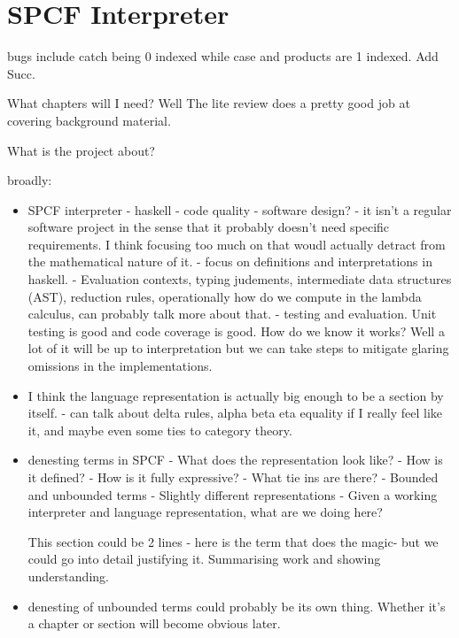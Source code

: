 \documentclass[12pt,a4paper]{report}
\theoremstyle{definition}
\theoremstyle{remark}
\begin{document}
\chapter{SPCF Interpreter}

bugs include catch being 0 indexed while case and products are 1 indexed. Add Succ.

What chapters will I need?
Well The lite review does a pretty good job at covering background material.

What is the project about?

broadly:
\begin{itemize}
    \item SPCF interpreter
        - haskell 
        - code quality
        - software design?
        - it isn't a regular software project in the sense that it probably doesn't need specific requirements. I think focusing too much on that woudl actually detract from the mathematical nature of it.
        - focus on definitions and interpretations in haskell.
        - Evaluation contexts, typing judements, intermediate data structures (AST), reduction rules, operationally how do we compute in the lambda calculus, can probably talk more about that.
        - testing and evaluation. Unit testing is good and code coverage is good. How do we know it works? Well a lot of it will be up to interpretation but we can take steps to mitigate glaring omissions in the implementations.
    \item I think the language representation is actually big enough to be a section by itself.
        - can talk about delta rules, alpha beta eta equality if I really feel like it, and maybe even some ties to category theory.
    \item denesting terms in SPCF
        - What does the representation look like?
        - How is it defined?
        - How is it fully expressive?
        - What tie ins are there? 
        - Bounded and unbounded terms
        - Slightly different representations
        - Given a working interpreter and language representation, what are we doing here?

        This section could be 2 lines - here is the term that does the magic- but we could go into detail justifying it. Summarising work and showing understanding.
    \item denesting of unbounded terms could probably be its own thing. Whether it's a chapter or section will become obvious later.
\end{itemize}
\end{document}
